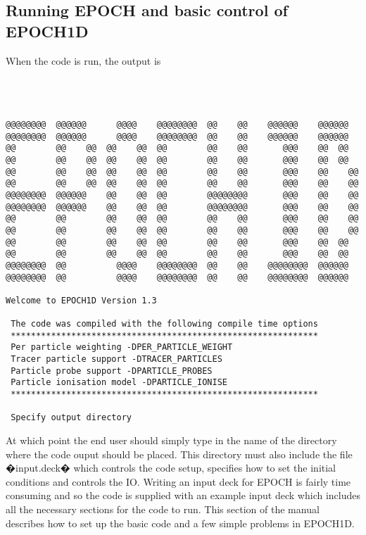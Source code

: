 \documentclass[12pt]{article}
\newcommand{\boxverbatim}[1]{\begin{Verbatim}[obeytabs=true,frame=single,
  framerule=0.5mm,rulecolor=\color{warwickmid},label=#1]}
\newcommand{\EPOCH}{{\color{warwickdark}\fontfamily{phv}\selectfont EPOCH} }
\begin{document}
\subsection{Running \EPOCH and basic control of EPOCH1D}
When the code is run, the output is\\
\\
\\
\\
\boxverbatim{Command line output}
@@@@@@@@  @@@@@@      @@@@    @@@@@@@@  @@    @@    @@@@@@    @@@@@@
@@@@@@@@  @@@@@@      @@@@    @@@@@@@@  @@    @@    @@@@@@    @@@@@@
@@        @@    @@  @@    @@  @@        @@    @@       @@@    @@  @@
@@        @@    @@  @@    @@  @@        @@    @@       @@@    @@  @@
@@        @@    @@  @@    @@  @@        @@    @@       @@@    @@    @@
@@        @@    @@  @@    @@  @@        @@    @@       @@@    @@    @@
@@@@@@@@  @@@@@@    @@    @@  @@        @@@@@@@@       @@@    @@    @@
@@@@@@@@  @@@@@@    @@    @@  @@        @@@@@@@@       @@@    @@    @@
@@        @@        @@    @@  @@        @@    @@       @@@    @@    @@
@@        @@        @@    @@  @@        @@    @@       @@@    @@    @@
@@        @@        @@    @@  @@        @@    @@       @@@    @@  @@
@@        @@        @@    @@  @@        @@    @@       @@@    @@  @@
@@@@@@@@  @@          @@@@    @@@@@@@@  @@    @@    @@@@@@@@  @@@@@@
@@@@@@@@  @@          @@@@    @@@@@@@@  @@    @@    @@@@@@@@  @@@@@@

Welcome to EPOCH1D Version 1.3

 The code was compiled with the following compile time options
 *************************************************************
 Per particle weighting -DPER_PARTICLE_WEIGHT
 Tracer particle support -DTRACER_PARTICLES
 Particle probe support -DPARTICLE_PROBES
 Particle ionisation model -DPARTICLE_IONISE
 *************************************************************

 Specify output directory
\end{Verbatim}

At which point the end user should simply type in the name of the directory
where the code ouput should be placed. This directory must also include the
file �input.deck� which controls the code setup, specifies how to set the
initial conditions and controls the IO. Writing an input deck for \EPOCH is
fairly time consuming and so the code is supplied with an example input deck
which includes all the necessary sections for the code to run. This section of
the manual describes how to set up the basic code and a few simple problems in
EPOCH1D.
\pagebreak
\end{document}
